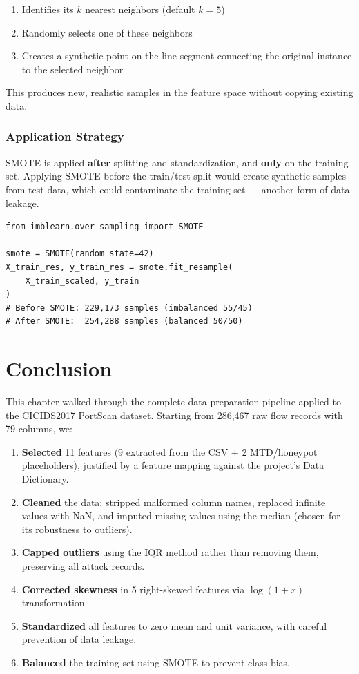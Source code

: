 \documentclass[12pt,a4paper]{report}
\begin{document}
\begin{enumerate}
    \item Identifies its $k$ nearest neighbors (default $k=5$)
    \item Randomly selects one of these neighbors
    \item Creates a synthetic point on the line segment connecting the original instance to the selected neighbor
\end{enumerate}

This produces new, realistic samples in the feature space without copying existing data.

\subsubsection{Application Strategy}

SMOTE is applied \textbf{after} splitting and standardization, and \textbf{only} on the training set. Applying SMOTE before the train/test split would create synthetic samples from test data, which could contaminate the training set — another form of data leakage.

\begin{lstlisting}[caption={Applying SMOTE to the training set only}]
from imblearn.over_sampling import SMOTE

smote = SMOTE(random_state=42)
X_train_res, y_train_res = smote.fit_resample(
    X_train_scaled, y_train
)
# Before SMOTE: 229,173 samples (imbalanced 55/45)
# After SMOTE:  254,288 samples (balanced 50/50)
\end{lstlisting}

\section{Conclusion}

This chapter walked through the complete data preparation pipeline applied to the CICIDS2017 PortScan dataset. Starting from 286,467 raw flow records with 79 columns, we:

\begin{enumerate}
    \item \textbf{Selected} 11 features (9 extracted from the CSV + 2 MTD/honeypot placeholders), justified by a feature mapping against the project's Data Dictionary.
    \item \textbf{Cleaned} the data: stripped malformed column names, replaced infinite values with NaN, and imputed missing values using the median (chosen for its robustness to outliers).
    \item \textbf{Capped outliers} using the IQR method rather than removing them, preserving all attack records.
    \item \textbf{Corrected skewness} in 5 right-skewed features via $\log(1+x)$ transformation.
    \item \textbf{Standardized} all features to zero mean and unit variance, with careful prevention of data leakage.
    \item \textbf{Balanced} the training set using SMOTE to prevent class bias.
\end{enumerate}
\end{document}
